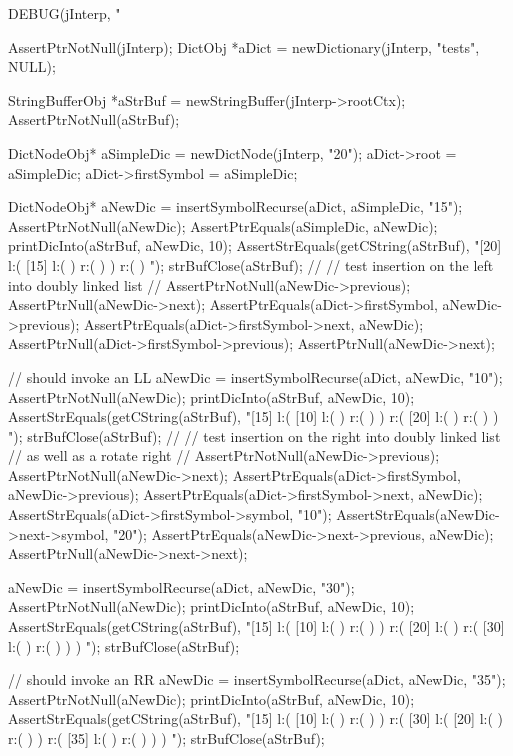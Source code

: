 \startCTest
  DEBUG(jInterp, "\n%

  AssertPtrNotNull(jInterp);
  DictObj *aDict = newDictionary(jInterp, "tests", NULL);

  StringBufferObj *aStrBuf = newStringBuffer(jInterp->rootCtx);
  AssertPtrNotNull(aStrBuf);
  
  DictNodeObj* aSimpleDic = newDictNode(jInterp, "20");
  aDict->root             = aSimpleDic;
  aDict->firstSymbol      = aSimpleDic;

  DictNodeObj* aNewDic = insertSymbolRecurse(aDict, aSimpleDic, "15");
  AssertPtrNotNull(aNewDic);
  AssertPtrEquals(aSimpleDic, aNewDic);
  printDicInto(aStrBuf, aNewDic, 10);
  AssertStrEquals(getCString(aStrBuf),
  "[20] l:( [15] l:(  ) r:(  )  ) r:(  ) ");
  strBufClose(aStrBuf);
  //
  // test insertion on the left into doubly linked list
  //
  AssertPtrNotNull(aNewDic->previous);
  AssertPtrNull(aNewDic->next);
  AssertPtrEquals(aDict->firstSymbol, aNewDic->previous);
  AssertPtrEquals(aDict->firstSymbol->next, aNewDic);
  AssertPtrNull(aDict->firstSymbol->previous);
  AssertPtrNull(aNewDic->next);

  // should invoke an LL
  aNewDic = insertSymbolRecurse(aDict, aNewDic, "10");
  AssertPtrNotNull(aNewDic);
  printDicInto(aStrBuf, aNewDic, 10);
  AssertStrEquals(getCString(aStrBuf),
  "[15] l:( [10] l:(  ) r:(  )  ) r:( [20] l:(  ) r:(  )  ) ");
  strBufClose(aStrBuf);
  //
  // test insertion on the right into doubly linked list
  // as well as a rotate right
  //
  AssertPtrNotNull(aNewDic->previous);
  AssertPtrNotNull(aNewDic->next);
  AssertPtrEquals(aDict->firstSymbol, aNewDic->previous);
  AssertPtrEquals(aDict->firstSymbol->next, aNewDic);
  AssertStrEquals(aDict->firstSymbol->symbol, "10");
  AssertStrEquals(aNewDic->next->symbol, "20");
  AssertPtrEquals(aNewDic->next->previous, aNewDic);
  AssertPtrNull(aNewDic->next->next);

  aNewDic = insertSymbolRecurse(aDict, aNewDic, "30");
  AssertPtrNotNull(aNewDic);
  printDicInto(aStrBuf, aNewDic, 10);
  AssertStrEquals(getCString(aStrBuf),
  "[15] l:( [10] l:(  ) r:(  )  ) r:( [20] l:(  ) r:( [30] l:(  ) r:(  )  )  ) ");
  strBufClose(aStrBuf);
  
  // should invoke an RR
  aNewDic = insertSymbolRecurse(aDict, aNewDic, "35");
  AssertPtrNotNull(aNewDic);
  printDicInto(aStrBuf, aNewDic, 10);
  AssertStrEquals(getCString(aStrBuf),
  "[15] l:( [10] l:(  ) r:(  )  ) r:( [30] l:( [20] l:(  ) r:(  )  ) r:( [35] l:(  ) r:(  )  )  ) ");
  strBufClose(aStrBuf);

